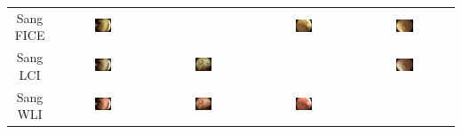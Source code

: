 \documentclass[12pt]{extreport}
\begin{document}
\begin{table}[H]
\begin{tabular}{c | c | c | c | c}
        Sang FICE  & \includegraphics[width=0.185\textwidth]{transform/BLI2FICE.jpeg}     &                                                                       & \includegraphics[width=0.185\textwidth]{transform/LCI2FICE.jpeg}     & \includegraphics[width=0.185\textwidth]{transform/WLI2FICE.jpeg}     \\
        Sang LCI   & \includegraphics[width=0.185\textwidth]{transform/BLI2LCI.jpeg}      & \includegraphics[width=0.185\textwidth]{transform/FICE2LCI.jpeg}      &                                                                      & \includegraphics[width=0.185\textwidth]{transform/WLI2LCI.jpeg}      \\
        Sang WLI   & \includegraphics[width=0.185\textwidth]{transform/BLI2WLI.jpeg}      & \includegraphics[width=0.185\textwidth]{transform/FICE2WLI.jpeg}      & \includegraphics[width=0.185\textwidth]{transform/LCI2WLI.jpeg}      &                                                                      \\

\end{tabular}
\end{table}
\end{document}
